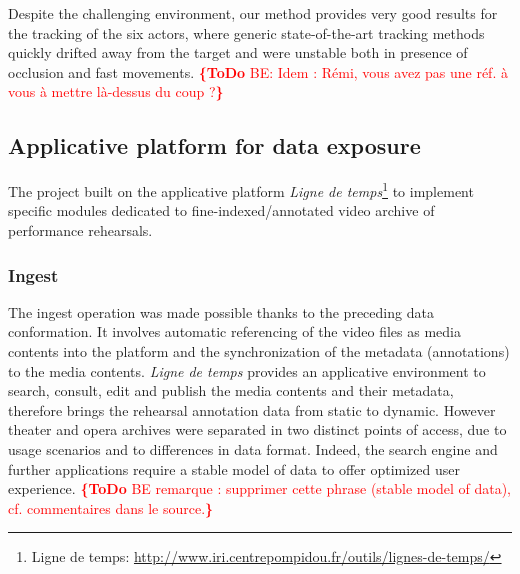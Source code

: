 \documentclass[conference]{IEEEtran}
\newcommand{\todo}[1]{\noindent\textcolor{red}{{\bf \{ToDo} #1{\bf \}}}}
\begin{document}
Despite the challenging environment, our method provides very good results for the tracking of the six actors, where generic state-of-the-art tracking methods quickly drifted away from the target  and were unstable both in presence of occlusion and fast movements. 
\todo{BE: Idem : Rémi, vous avez pas une réf. à vous à mettre là-dessus du coup ?}



\subsection{Applicative platform for data exposure}
The project built on the applicative platform \emph{Ligne de temps}\footnote{Ligne de temps: \url{http://www.iri.centrepompidou.fr/outils/lignes-de-temps/}} to implement specific modules dedicated to fine-indexed/annotated video archive of performance rehearsals.

\subsubsection{Ingest}
The ingest operation was made possible thanks to the preceding data conformation. It involves automatic referencing of the video files as media contents into the platform and the synchronization of the metadata (annotations) to the media contents. \emph{Ligne de temps} provides an applicative environment to search, consult, edit and publish the media contents and their metadata, therefore brings the rehearsal annotation data from static to dynamic. \linebreak
However theater and opera archives were separated in two distinct points of access, due to usage scenarios and to differences in data format.
 Indeed, the search engine and further applications require a stable model of data to offer optimized user experience.
\todo{BE remarque : supprimer cette phrase (stable model of data), cf. commentaires dans le source.}
\end{document}
